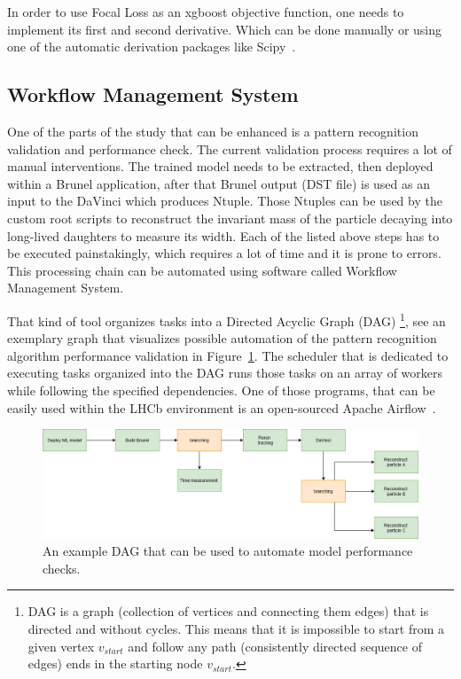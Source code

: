In order to use Focal Loss as an xgboost objective function, one needs to implement its first and second derivative. Which can be done manually or using one of the automatic derivation packages like Scipy~\cite{scipy}.  


\subsection{Workflow Management System}

One of the parts of the study that can be enhanced is a pattern recognition validation and performance check. 
The current validation process requires a lot of manual interventions. The trained model needs to be extracted, then deployed within a Brunel application, after that Brunel output (DST file) is used as an input to the DaVinci which produces Ntuple. Those Ntuples can be used by the custom root scripts to reconstruct the invariant mass of the particle decaying into long-lived daughters to measure its width. Each of the listed above steps has to be executed painstakingly, which requires a lot of time and it is prone to errors. This processing chain can be automated using software called Workflow Management System. 

That kind of tool organizes tasks into a Directed Acyclic Graph (DAG) \footnote{DAG is a graph (collection of vertices and connecting them edges) that is directed and without cycles. This means that it is impossible to start from a given vertex $v_{start}$ and follow any path (consistently directed sequence of edges) ends in the starting node $v_{start}$.}, see an exemplary graph that visualizes possible automation of the pattern recognition algorithm performance validation in Figure~\ref{fig:DAG}. The scheduler that is dedicated to executing tasks organized into the DAG runs those tasks on an array of workers while following the specified dependencies. One of those programs, that can be easily used within the LHCb environment is an open-sourced Apache Airflow~\cite{airflow}.


\begin{figure}[!h]
\centering
\includegraphics[scale=0.8]{figures/Upgrade_wokflow.png}
\caption{An example DAG that can be used to automate model performance checks. 
\label{fig:DAG}}
\end{figure}